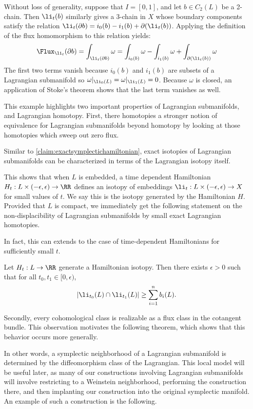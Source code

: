 Without loss of generality, suppose that $I=[0,1]$, and let $b\in C_2(L)$ be a 2-chain.
Then $\li_t(b)$ similarly gives a 3-chain in $X$ whose boundary components satisfy the relation $\li_t(\partial b)=i_0(b)-i_1(b)+\partial(\li_t(b))$. 
Applying the definition of the flux homomorphism to this relation yields:
\[
    \Flux_{\li_t}(\partial b)=\int_{\li_t(\partial b)}\omega=\int_{i_0(b)}\omega-\int_{i_1(b)}\omega + \int_{\partial(\li_t(b))}\omega\]
The first two terms vanish because $i_0(b)$ and $i_1(b)$ are subsets of a Lagrangian submanifold so $\omega|_{\li_0(L)}=\omega|_{\li_1(L)}=0$.
Because $\omega$ is closed, an application of Stoke's theorem shows that the last term vanishes as well. 



This example highlights two important properties of Lagrangian submanifolds, and Lagrangian homotopy. 
First, there homotopies a stronger notion of equivalence for Lagrangian submanifolds beyond homotopy by looking at those homotopies which sweep out zero flux. 

Similar to \cref{claim:exactsymplectichamiltonian}, exact isotopies of Lagrangian submanifolds can be characterized in terms of the Lagrangian isotopy itself. 


This shows that when $L$ is embedded, a time dependent Hamiltonian $H_t: L\times (-\epsilon, \epsilon)\to \RR$ defines an isotopy of embeddings $\li_t: L\times(-\epsilon, \epsilon)\to X$ for small values of $t$.
We say this is the isotopy generated by the Hamiltonian $H$.
Provided that $L$ is compact, we immediately get the following statement on the non-displacibility of Lagrangian submanifolds by small exact Lagrangian homotopies. 


In fact, this can extends to the case of time-dependent Hamiltonians for sufficiently small $t$. 
\begin{corollary}
    Let $H_t: L\to \RR$ generate a Hamiltonian isotopy. 
    Then there exists $\epsilon>0$ such that for all $t_0, t_1\in [0,\epsilon)$, 
    \[|\li_{t_0}(L)\cap \li_{t_1}(L)|\geq \sum_{i=1}^n b_i(L).\]
\end{corollary}
Secondly, every cohomological class is realizable as a flux class in the cotangent bundle. 
This observation motivates the following theorem, which shows that this behavior occurs more generally.

In other words,  a symplectic neighborhood of a Lagrangian submanifold is determined by the diffeomorphism class of the Lagrangian. 
This local model will be useful later, as many of our constructions involving Lagrangian submanifolds will involve restricting to a Weinstein neighborhood, performing the construction there, and then implanting our construction into the original symplectic manifold.
An example of such a construction is the following.












